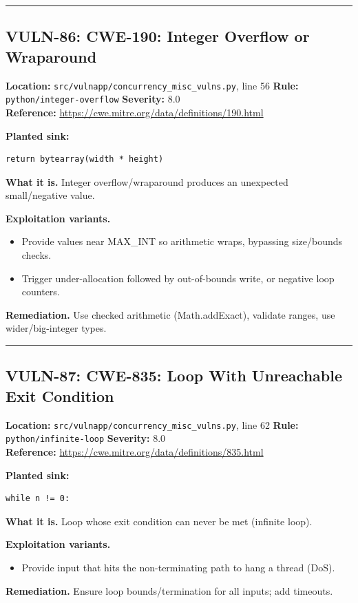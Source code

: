 \documentclass[11pt,a4paper]{article}
\begin{document}
\vspace{4pt}\hrule\vspace{6pt}
\subsection{VULN-86: CWE-190: Integer Overflow or Wraparound}
\noindent\textbf{Location:} \texttt{src/vulnapp/concurrency\_misc\_vulns.py}, line 56 \quad \textbf{Rule:} \texttt{python/integer-overflow} \quad \textbf{Severity:} 8.0
\\ \textbf{Reference:} \url{https://cwe.mitre.org/data/definitions/190.html}

\noindent\textbf{Planted sink:}
\begin{lstlisting}
return bytearray(width * height)
\end{lstlisting}
\noindent\textbf{What it is.} Integer overflow/wraparound produces an unexpected small/negative value.

\noindent\textbf{Exploitation variants.}
\begin{itemize}[leftmargin=1.4em,itemsep=1pt,topsep=2pt]
\item Provide values near MAX\_INT so arithmetic wraps, bypassing size/bounds checks.
\item Trigger under-allocation followed by out-of-bounds write, or negative loop counters.
\end{itemize}
\noindent\textbf{Remediation.} Use checked arithmetic (Math.addExact), validate ranges, use wider/big-integer types.

\vspace{4pt}\hrule\vspace{6pt}
\subsection{VULN-87: CWE-835: Loop With Unreachable Exit Condition}
\noindent\textbf{Location:} \texttt{src/vulnapp/concurrency\_misc\_vulns.py}, line 62 \quad \textbf{Rule:} \texttt{python/infinite-loop} \quad \textbf{Severity:} 8.0
\\ \textbf{Reference:} \url{https://cwe.mitre.org/data/definitions/835.html}

\noindent\textbf{Planted sink:}
\begin{lstlisting}
while n != 0:
\end{lstlisting}
\noindent\textbf{What it is.} Loop whose exit condition can never be met (infinite loop).

\noindent\textbf{Exploitation variants.}
\begin{itemize}[leftmargin=1.4em,itemsep=1pt,topsep=2pt]
\item Provide input that hits the non-terminating path to hang a thread (DoS).
\end{itemize}
\noindent\textbf{Remediation.} Ensure loop bounds/termination for all inputs; add timeouts.
\end{document}
